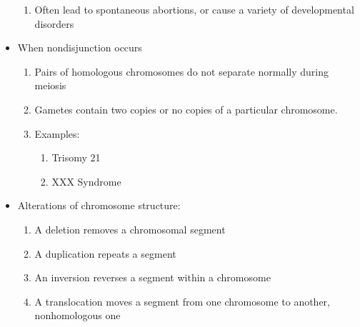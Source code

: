 \documentclass[12pt]{article}
\begin{document}
\begin{itemize}
\begin{enumerate}
      \item Often lead to spontaneous abortions, or cause a variety of developmental disorders

    \end{enumerate}

  \item When nondisjunction occurs

    \begin{enumerate}

      \item Pairs of homologous chromosomes do not separate normally during meiosis

      \item Gametes contain two copies or no copies of a particular chromosome.

      \item Examples:

        \begin{enumerate}

          \item Trisomy 21

          \item XXX Syndrome

        \end{enumerate}

    \end{enumerate}

  \item Alterations of chromosome structure:

    \begin{enumerate}

      \item A deletion removes a chromosomal segment

      \item A duplication repeats a segment

      \item An inversion reverses a segment within a chromosome

      \item A translocation moves a segment from one chromosome to another, nonhomologous one

    \end{enumerate}

\end{itemize}
\end{document}
